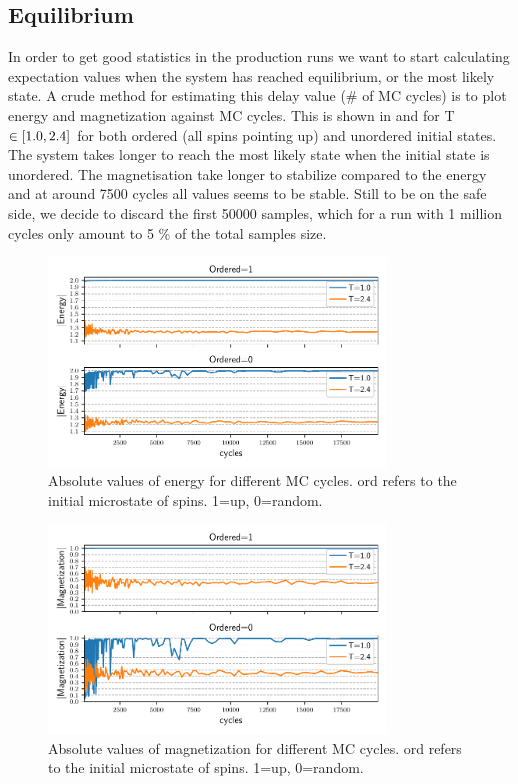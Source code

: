 \subsection{Equilibrium}
In order to get good statistics in the production runs we want to start calculating expectation values
when the system has reached equilibrium, or the most likely state. A crude
method for estimating this delay value (\# of MC cycles) is to plot energy and
magnetization against MC cycles. This is shown in  and   for T $\in \left[1.0,2.4\right]$ for both
ordered (all spins pointing up) and unordered initial states. The system takes
longer to reach the most likely state when the initial state is unordered. The
magnetisation take longer to stabilize compared to the energy and at around 7500
cycles all values seems to be stable. Still to be on the safe side, we decide to
discard the first 50000 samples, which for a run with 1 million cycles only
amount to 5 \% of the total samples size.

\begin{figure}[H]
  \centering
  \includegraphics[width=0.8\textwidth]{../figures/equilibrium_E.pdf}
  \caption{Absolute values of energy for different MC cycles.
  ord refers to the initial microstate of spins. 1=up, 0=random.}
  \label{fig:equi_E}
\end{figure}


\begin{figure}[H]
  \centering
  \includegraphics[width=0.8\textwidth]{../figures/equilibrium_Mabs.pdf}
  \caption{Absolute values of magnetization for different MC cycles.
  ord refers to the initial microstate of spins. 1=up, 0=random.}
  \label{fig:equi_M}
\end{figure}




